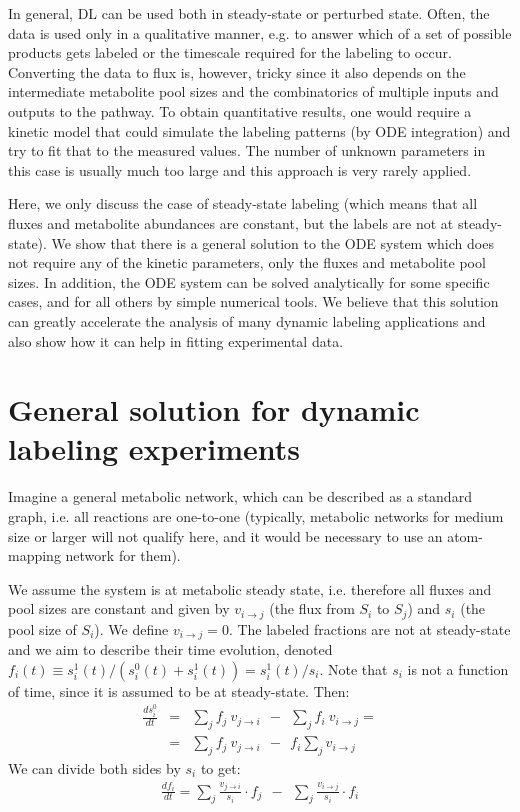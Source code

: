 \documentclass{article}
\newcommand{\flux}[2]{\ensuremath{v_{{#1} \rightarrow {#2}}}}
\begin{document}
In general, DL can be used both in steady-state or perturbed state. Often, the data is used only in a qualitative manner, e.g. to answer which of a set of possible products gets labeled or the timescale required for the labeling to occur. Converting the data to flux is, however, tricky since it also depends on the intermediate metabolite pool sizes and the combinatorics of multiple inputs and outputs to the pathway. To obtain quantitative results, one would require a kinetic model that could simulate the labeling patterns (by ODE integration) and try to fit that to the measured values. The number of unknown parameters in this case is usually much too large and this approach is very rarely applied.

Here, we only discuss the case of steady-state labeling (which means that all fluxes and metabolite abundances are constant, but the labels are not at steady-state). We show that there is a general solution to the ODE system which does not require any of the kinetic parameters, only the fluxes and metabolite pool sizes. In addition, the ODE system can be solved analytically for some specific cases, and for all others by simple numerical tools. We believe that this solution can greatly accelerate the analysis of many dynamic labeling applications and also show how it can help in fitting experimental data.


\section{General solution for dynamic labeling experiments}
Imagine a general metabolic network, which can be described as a standard graph, i.e. all reactions are one-to-one (typically, metabolic networks for medium size or larger will not qualify here, and it would be necessary to use an atom-mapping network for them).

We assume the system is at metabolic steady state, i.e. therefore all fluxes and pool sizes are constant and given by \flux{i}{j} (the flux from $S_i$ to $S_j$) and $s_i$ (the pool size of $S_i$). We define $\flux{i}{j} = 0$. The labeled fractions are not at steady-state and we aim to describe their time evolution, denoted $f_i(t) \equiv s_i^1(t) / (s_i^0(t) + s_i^1(t)) = s_i^1(t) / s_i$. Note that $s_i$ is not a function of time, since it is assumed to be at steady-state. Then:
\begin{eqnarray}
    \frac{d s_i^0}{dt} &=& \sum_j f_j~\flux{j}{i} ~~-~~ \sum_j f_i~\flux{i}{j} = \\
    &=& \sum_j f_j~\flux{j}{i} ~~-~~ f_i \sum_j \flux{i}{j}
\end{eqnarray}
We can divide both sides by $s_i$ to get:
\begin{eqnarray}
    \frac{d f_i}{dt} = \sum_j \frac{\flux{j}{i}}{s_i} \cdot f_j ~~-~~ \sum_j \frac{\flux{i}{j}}{s_i} \cdot f_i
\end{eqnarray}
\end{document}
